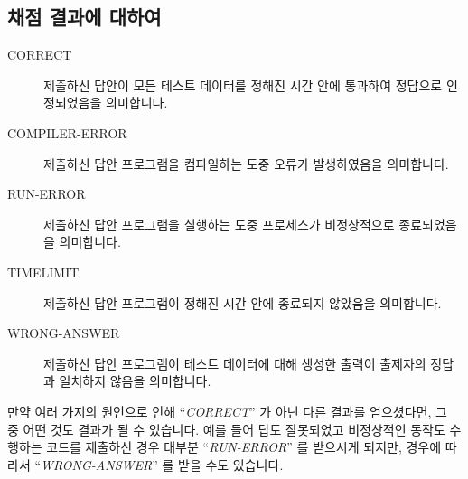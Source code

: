 \subsection*{채점 결과에 대하여}

\begin{description}
\item[CORRECT] 제출하신 답안이 모든 테스트 데이터를 정해진 시간 안에 통과하여 정답으로 인정되었음을 의미합니다.
\item[COMPILER-ERROR] 제출하신 답안 프로그램을 컴파일하는 도중 오류가 발생하였음을 의미합니다.
\item[RUN-ERROR] 제출하신 답안 프로그램을 실행하는 도중 프로세스가 비정상적으로 종료되었음을 의미합니다.
\item[TIMELIMIT] 제출하신 답안 프로그램이 정해진 시간 안에 종료되지 않았음을 의미합니다.
\item[WRONG-ANSWER] 제출하신 답안 프로그램이 테스트 데이터에 대해 생성한 출력이 출제자의 정답과 일치하지 않음을 의미합니다.
\end{description}

만약 여러 가지의 원인으로 인해 ``\emph{CORRECT}'' 가 아닌 다른 결과를 얻으셨다면, 그 중 어떤 것도 결과가 될 수 있습니다.
예를 들어 답도 잘못되었고 비정상적인 동작도 수행하는 코드를 제출하신 경우 대부분 ``\emph{RUN-ERROR}'' 를 받으시게 되지만, 경우에 따라서 ``\emph{WRONG-ANSWER}'' 를 받을 수도 있습니다.

\clearpage
